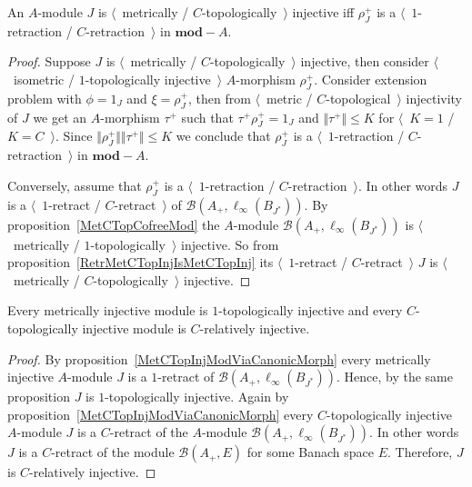 \begin{proposition}\label{MetCTopInjModViaCanonicMorph} An $A$-module $J$ is
$\langle$~metrically / $C$-topologically~$\rangle$ injective iff $\rho_J^+$ is 
a $\langle$~$1$-retraction / $C$-retraction~$\rangle$ in $\mathbf{mod}-A$.
\end{proposition}
\begin{proof}
Suppose $J$ is 
$\langle$~metrically / $C$-topologically~$\rangle$ injective, then consider 
$\langle$~isometric / $1$-topologically injective~$\rangle$
$A$-morphism $\rho_J^+$. Consider extension problem with $\phi=1_J$ 
and $\xi=\rho_J^+$, then from $\langle$~metric / $C$-topological~$\rangle$ 
injectivity of $J$ we get an $A$-morphism $\tau^+$ such 
that $\tau^+\rho_J^+=1_J$
and $\Vert\tau^+\Vert\leq K$ for $\langle$~$K=1$ / $K=C$~$\rangle$. 
Since $\Vert\rho_J^+\Vert\Vert \tau^+\Vert\leq K$ 
we conclude that $\rho_J^+$ is 
a $\langle$~$1$-retraction / $C$-retraction~$\rangle$ in $\mathbf{mod}-A$.

Conversely, assume that $\rho_J^+$ is 
a $\langle$~$1$-retraction / $C$-retraction~$\rangle$. In other words $J$ is 
a $\langle$~$1$-retract / $C$-retract~$\rangle$ of 
$\mathcal{B}(A_+, \ell_\infty(B_{J^*}))$. By proposition~\ref{MetCTopCofreeMod} 
the $A$-module $\mathcal{B}(A_+, \ell_\infty(B_{J^*}))$ 
is $\langle$~metrically / $1$-topologically~$\rangle$ injective. So from 
proposition~\ref{RetrMetCTopInjIsMetCTopInj} 
its $\langle$~$1$-retract / $C$-retract~$\rangle$ $J$ is 
$\langle$~metrically / $C$-topologically~$\rangle$ injective.
\end{proof}

\begin{proposition}\label{MetInjIsTopInjAndTopInjIsRelInj} Every metrically
injective module is $1$-topologically injective and every $C$-topologically 
injective module is $C$-relatively injective.
\end{proposition}
\begin{proof} By proposition~\ref{MetCTopInjModViaCanonicMorph} every 
metrically injective $A$-module $J$ is a $1$-retract 
of $\mathcal{B}(A_+, \ell_\infty(B_{J^*}))$. Hence, by the same proposition $J$ 
is $1$-topologically injective. Again by 
proposition~\ref{MetCTopInjModViaCanonicMorph} every $C$-topologically 
injective $A$-module $J$ is a $C$-retract 
of the $A$-module $\mathcal{B}(A_+, \ell_\infty(B_{J^*}))$. 
In other words $J$ is a $C$-retract of the module $\mathcal{B}(A_+, E)$ for 
some Banach space $E$. Therefore, $J$ is $C$-relatively injective.
\end{proof}

